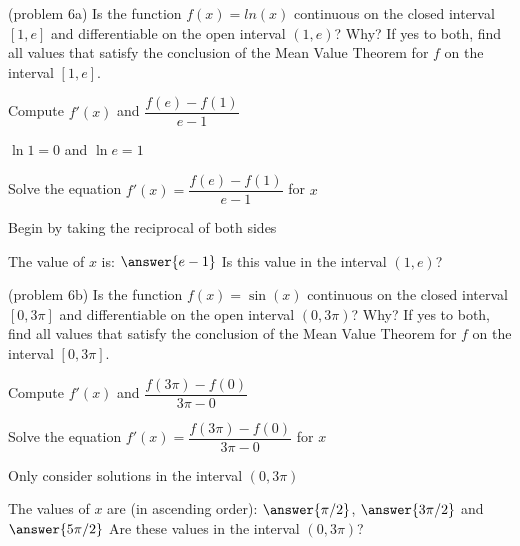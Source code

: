 \documentclass[handout]{ximera}
\begin{document}
\begin{problem}(problem 6a) 
  Is the function $f(x) = ln(x)$ continuous on the closed interval $[1,e]$ and differentiable on the open interval $(1,e)$? Why?
  If yes to both, find all values that satisfy the conclusion of the Mean Value Theorem for $f$ on the interval $[1,e]$.
	
    \begin{hint}
      Compute $f'(x)$ and $\dfrac{f(e) - f(1)}{e-1}$
    \end{hint}
    \begin{hint}
    $\ln 1 = 0$ and $\ln e = 1$
    \end{hint}
		\begin{hint}
		  Solve the equation $f'(x) = \dfrac{f(e) - f(1)}{e-1}$ for $x$
		\end{hint}
    \begin{hint}
    Begin by taking the reciprocal of both sides
    \end{hint}
		
		The value of $x$ is:
		 $\answer{e-1}$
     Is this value in the interval $(1,e)$?
\end{problem}


\begin{problem}(problem 6b)
  Is the function $f(x) = \sin(x)$ continuous on the closed interval $[0, 3\pi]$ and differentiable on the open interval $(0, 3\pi)$? Why?
  If yes to both, find all values that satisfy the conclusion of the Mean Value Theorem for $f$ on the interval $[0, 3\pi]$.
	
    \begin{hint}
      Compute $f'(x)$ and $\dfrac{f(3\pi) - f(0)}{3\pi - 0}$
    \end{hint}
		\begin{hint}
		  Solve the equation $f'(x) = \dfrac{f(3\pi) - f(0)}{3\pi - 0}$ for $x$
		\end{hint}
    \begin{hint}
    Only consider solutions in the interval $(0, 3\pi)$
    \end{hint}
		
		The values of $x$ are (in ascending order):
		 $\answer{\pi /2}$, $\answer{3\pi /2}$ and $\answer{5\pi /2}$
     Are these values in the interval $(0, 3\pi)$?
\end{problem}
\end{document}
